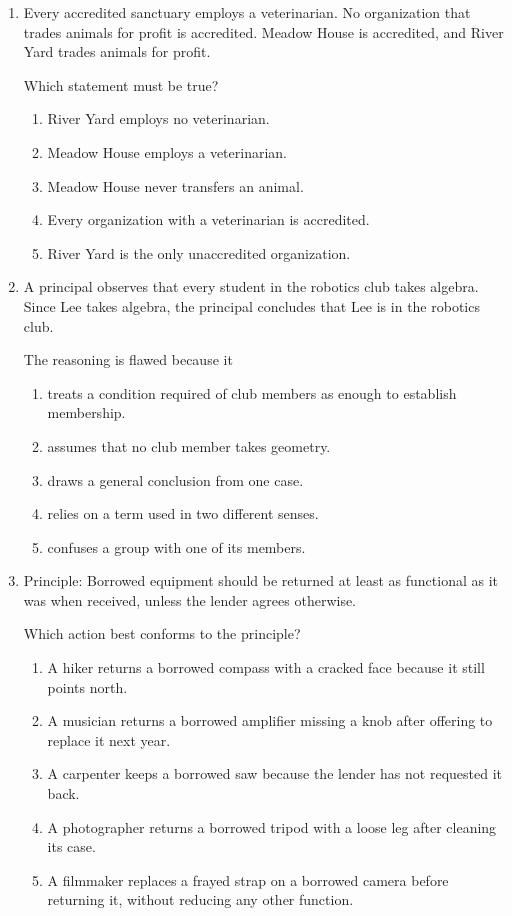 \begin{enumerate}
\item Every accredited sanctuary employs a veterinarian. No organization that trades animals for profit is accredited. Meadow House is accredited, and River Yard trades animals for profit.

Which statement must be true?
\begin{enumerate}
\item[(A)] River Yard employs no veterinarian.
\item[(B)] Meadow House employs a veterinarian.
\item[(C)] Meadow House never transfers an animal.
\item[(D)] Every organization with a veterinarian is accredited.
\item[(E)] River Yard is the only unaccredited organization.
\end{enumerate}

\item A principal observes that every student in the robotics club takes algebra. Since Lee takes algebra, the principal concludes that Lee is in the robotics club.

The reasoning is flawed because it
\begin{enumerate}
\item[(A)] treats a condition required of club members as enough to establish membership.
\item[(B)] assumes that no club member takes geometry.
\item[(C)] draws a general conclusion from one case.
\item[(D)] relies on a term used in two different senses.
\item[(E)] confuses a group with one of its members.
\end{enumerate}

\item Principle: Borrowed equipment should be returned at least as functional as it was when received, unless the lender agrees otherwise.

Which action best conforms to the principle?
\begin{enumerate}
\item[(A)] A hiker returns a borrowed compass with a cracked face because it still points north.
\item[(B)] A musician returns a borrowed amplifier missing a knob after offering to replace it next year.
\item[(C)] A carpenter keeps a borrowed saw because the lender has not requested it back.
\item[(D)] A photographer returns a borrowed tripod with a loose leg after cleaning its case.
\item[(E)] A filmmaker replaces a frayed strap on a borrowed camera before returning it, without reducing any other function.
\end{enumerate}


\end{enumerate}
